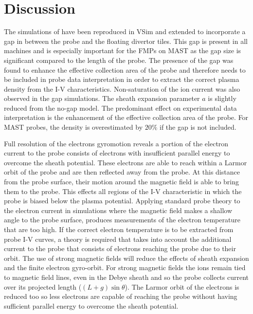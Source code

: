 
%
%
%
%







\section{Discussion}
The simulations of \cite{Bergmann-2002} have been reproduced in VSim and extended to incorporate a gap in between the probe and the floating divertor tiles. This gap is present in all machines and is especially important for the FMPs on MAST as the gap size is significant compared to the length of the probe. The presence of the gap was found to enhance the effective collection area of the probe and therefore needs to be included in probe data interpretation in order to extract the correct plasma density from the I-V characteristics. Non-saturation of the ion current was also observed in the gap simulations. The sheath expansion parameter $a$ is slightly reduced from the no-gap model. The predominant effect on experimental data interpretation is the enhancement of the effective collection area of the probe. For MAST probes, the density is overestimated by $20\%$ if the gap is not included. 

Full resolution of the electrons gyromotion reveals a portion of the electron current to the probe consists of electrons with insufficient parallel energy to overcome the sheath potential. These electrons are able to reach within a Larmor orbit of the probe and are then reflected away from the probe. At this distance from the probe surface, their motion around the magnetic field is able to bring them to the probe. This effects all regions of the I-V characteristic in which the probe is biased below the plasma potential. Applying standard probe theory to the electron current in simulations where the magnetic field makes a shallow angle to the probe surface, produces measurements of the electron temperature that are too high. If the correct electron temperature is to be extracted from probe I-V curves, a theory is required that takes into account the additional current to the probe that consists of electrons reaching the probe due to their orbit.
The use of strong magnetic fields will reduce the effects of sheath expansion and the finite electron gyro-orbit. For strong magnetic fields the ions remain tied to magnetic field lines, even in the Debye sheath and so the probe collects current over its projected length ($(L+g)\sin\theta$). The Larmor orbit of the electrons is reduced too so less electrons are capable of reaching the probe without having sufficient parallel energy to overcome the sheath potential.

